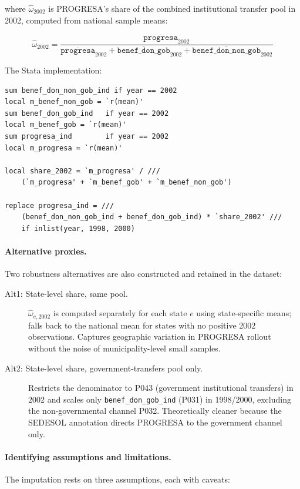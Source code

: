 where $\hat{\omega}_{2002}$ is PROGRESA's share of the combined institutional
transfer pool in 2002, computed from national sample means:

\begin{equation}
\hat{\omega}_{2002} =
  \frac{\overline{\texttt{progresa}}_{2002}}
       {\overline{\texttt{progresa}}_{2002}
        + \overline{\texttt{benef\_don\_gob}}_{2002}
        + \overline{\texttt{benef\_don\_non\_gob}}_{2002}}
\label{eq:share_2002}
\end{equation}

The Stata implementation:

\begin{verbatim}
sum benef_don_non_gob_ind if year == 2002
local m_benef_non_gob = `r(mean)'
sum benef_don_gob_ind   if year == 2002
local m_benef_gob = `r(mean)'
sum progresa_ind        if year == 2002
local m_progresa = `r(mean)'

local share_2002 = `m_progresa' / ///
    (`m_progresa' + `m_benef_gob' + `m_benef_non_gob')

replace progresa_ind = ///
    (benef_don_non_gob_ind + benef_don_gob_ind) * `share_2002' ///
    if inlist(year, 1998, 2000)
\end{verbatim}

\paragraph{Alternative proxies.}
Two robustness alternatives are also constructed and retained in the dataset:

\begin{description}
  \item[Alt1: State-level share, same pool.] $\hat{\omega}_{e,2002}$ is
    computed separately for each state $e$ using state-specific means; falls
    back to the national mean for states with no positive 2002 observations.
    Captures geographic variation in PROGRESA rollout without the noise of
    municipality-level small samples.
  \item[Alt2: State-level share, government-transfers pool only.] Restricts the
    denominator to P043 (government institutional transfers) in 2002 and
    scales only \texttt{benef\_don\_gob\_ind} (P031) in 1998/2000, excluding
    the non-governmental channel P032. Theoretically cleaner because the SEDESOL
    annotation directs PROGRESA to the government channel only.
\end{description}

\paragraph{Identifying assumptions and limitations.}
The imputation rests on three assumptions, each with caveats:

